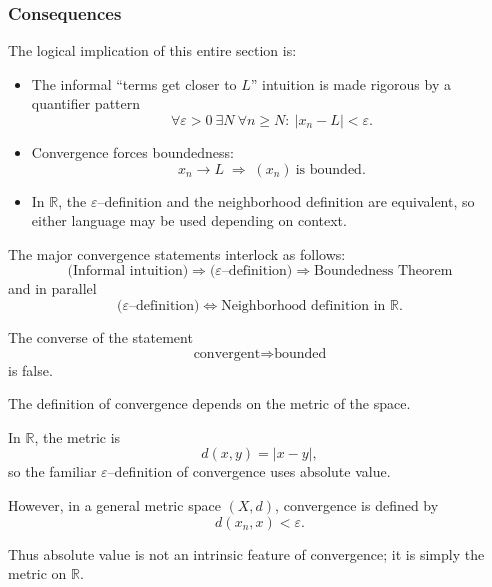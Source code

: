 \subsubsection{Consequences}

The logical implication of this entire section is:

\begin{itemize}
\item The informal ``terms get closer to $L$'' intuition is made rigorous by a quantifier pattern
\[
\forall \varepsilon>0\ \exists N\ \forall n\ge N:\ |x_n-L|<\varepsilon.
\]
\item Convergence forces boundedness:
\[
x_n \to L \;\Rightarrow\; (x_n)\ \text{is bounded}.
\]
\item In $\mathbb{R}$, the $\varepsilon$--definition and the neighborhood definition are equivalent, so either language may be used depending on context.
\end{itemize}

\begin{remark}
The major convergence statements interlock as follows:
\[
\text{(Informal intuition)}
\Rightarrow
\text{($\varepsilon$--definition)}
\Rightarrow
\text{Boundedness Theorem}
\]
and in parallel
\[
\text{($\varepsilon$--definition)}
\Longleftrightarrow
\text{Neighborhood definition in $\mathbb{R}$}.
\]
\end{remark}

\begin{proposition}
The converse of the statement
\[
\text{convergent} \Rightarrow \text{bounded}
\]
is false.
\end{proposition}





\begin{remark}
The definition of convergence depends on the metric of the space.

In $\mathbb{R}$, the metric is
\[
d(x,y) = |x-y|,
\]
so the familiar $\varepsilon$--definition of convergence uses absolute value.

However, in a general metric space $(X,d)$, convergence is defined by
\[
d(x_n,x) < \varepsilon.
\]

Thus absolute value is not an intrinsic feature of convergence;
it is simply the metric on $\mathbb{R}$.
\end{remark}
